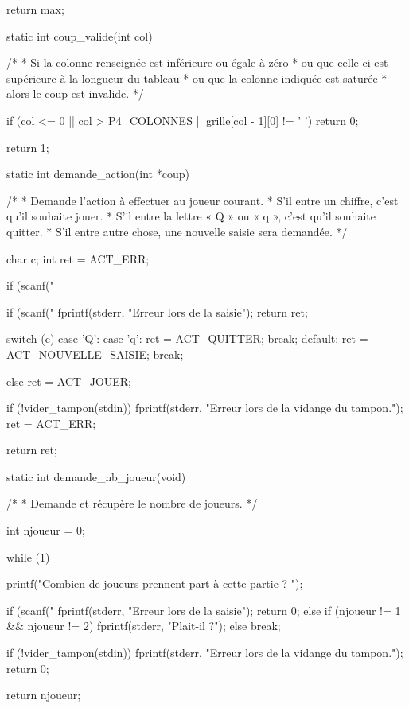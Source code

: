 \begin{C}
{    return max;
}


static int coup_valide(int col)
{
    /*
     * Si la colonne renseignée est inférieure ou égale à zéro
     * ou que celle-ci est supérieure à la longueur du tableau
     * ou que la colonne indiquée est saturée
     * alors le coup est invalide.
     */

    if (col <= 0 || col > P4_COLONNES || grille[col - 1][0] != ' ')
        return 0;

    return 1;
}


static int demande_action(int *coup)
{
    /*
     * Demande l'action à effectuer au joueur courant.
     * S'il entre un chiffre, c'est qu'il souhaite jouer.
     * S'il entre la lettre « Q » ou « q », c'est qu'il souhaite quitter.
     * S'il entre autre chose, une nouvelle saisie sera demandée.
     */

    char c;
    int ret = ACT_ERR;

    if (scanf("%
    {
        if (scanf("%
        {
            fprintf(stderr, "Erreur lors de la saisie\n");
            return ret;
        }

        switch (c)
        {
        case 'Q':
        case 'q':
            ret = ACT_QUITTER;
            break;
        default:
            ret = ACT_NOUVELLE_SAISIE;
            break;
        }
    }
    else
        ret = ACT_JOUER;

    if (!vider_tampon(stdin))
    {
         fprintf(stderr, "Erreur lors de la vidange du tampon.\n");
         ret = ACT_ERR;
    }

    return ret;
}


static int demande_nb_joueur(void)
{
    /*
     * Demande et récupère le nombre de joueurs.
     */

    int njoueur = 0;

    while (1)
    {
        printf("Combien de joueurs prennent part à cette partie ? ");

        if (scanf("%
        {
                fprintf(stderr, "Erreur lors de la saisie\n");
                return 0;
        }
        else if (njoueur != 1 && njoueur != 2)
            fprintf(stderr, "Plait-il ?\n");
        else
            break;

        if (!vider_tampon(stdin))
        {
            fprintf(stderr, "Erreur lors de la vidange du tampon.\n");
            return 0;
        }
    }

    return njoueur;
}



\end{C}
